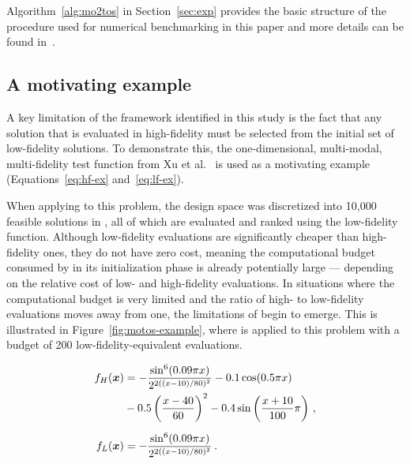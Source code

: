 Algorithm~\ref{alg:mo2tos} in Section~\ref{sec:exp} provides the basic structure of the \motos{} procedure used for numerical benchmarking in this paper and more details can be found in~\cite{xu2016mo2tos}.

\subsection{A motivating example}

A key limitation of the \motos{} framework identified in this study is the fact that any solution that is evaluated in high-fidelity must be selected from the initial set of low-fidelity solutions. To demonstrate this, the one-dimensional, multi-modal, multi-fidelity test function from Xu et al.~\cite{xu2016mo2tos} is used as a motivating example (Equations~\ref{eq:hf-ex} and~\ref{eq:lf-ex}).

When applying \motos{} to this problem, the design space was discretized into 10,000 feasible solutions in \cite{xu2016mo2tos}, all of which are evaluated and ranked using the low-fidelity function. Although low-fidelity evaluations are significantly cheaper than high-fidelity ones, they do not have zero cost, meaning the computational budget consumed by \motos{} in its initialization phase is already potentially large --- depending on the relative cost of low- and high-fidelity evaluations. In situations where the computational budget is very limited and the ratio of high- to low-fidelity evaluations moves away from one, the limitations of \motos{} begin to emerge. This is illustrated in Figure~\ref{fig:motos-example}, where \motos{} is applied to this problem with a budget of 200 low-fidelity-equivalent evaluations.

\begin{align}
f_H(\boldsymbol{x}) &= -\frac{\sin^6(0.09\pi x)}{2^{2((x-10)/80)^2}}-0.1\cos(0.5\pi x)\nonumber\\
           &-0.5\left(\frac{x-40}{60}\right)^2- 0.4\sin\left(\frac{x+10}{100}\pi\right)\,,\label{eq:hf-ex}\\[0.2cm]
f_L(\boldsymbol{x}) &= -\frac{\sin^6(0.09\pi x)}{2^{2((x-10)/80)^2}}\,. \label{eq:lf-ex}
\end{align}

